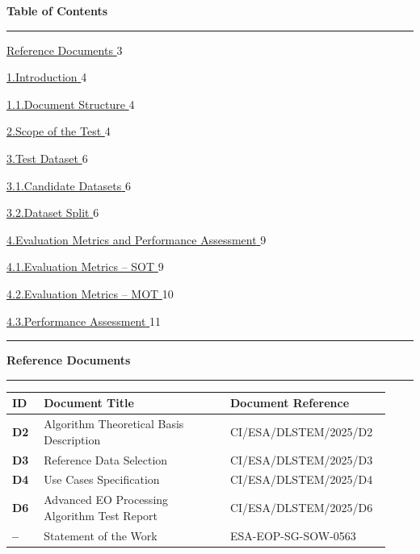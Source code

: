 \documentclass[11pt]{article}
\begin{document}
\newpage

{\centering\Large\bfseries Table of Contents\par}
\vspace{0.8cm}
\noindent\rule{\linewidth}{0.6pt}

\newcommand{\tocentry}[3]{%
  \noindent\hyperlink{#1}{%
    {\normalsize #2}%
  }\hfill{\normalsize #3}\par\vspace{0.25cm}%
}
\newcommand{\tocsub}[3]{%
  \noindent\hspace{1.2em}\hyperlink{#1}{%
    {\normalsize\color{gray} #2}%
  }\hfill{\normalsize\color{gray} #3}\par\vspace{0.2cm}%
}

\tocentry{_Toc1974584720}{Reference Documents}{3}
\tocentry{introduction}{1.\enspace Introduction}{4}
\tocsub{introduction}{1.1.\enspace Document Structure}{4}
\tocentry{Scope of the test}{2.\enspace Scope of the Test}{4}
\tocentry{Test dataset}{3.\enspace Test Dataset}{6}
\tocsub{Test dataset}{3.1.\enspace Candidate Datasets}{6}
\tocsub{Test dataset}{3.2.\enspace Dataset Split}{6}
\tocentry{Evaluation Metrics and Performance Assessment}{4.\enspace Evaluation Metrics and Performance Assessment}{9}
\tocsub{Evaluation Metrics - SOT}{4.1.\enspace Evaluation Metrics -- SOT}{9}
\tocsub{Evaluation Metrics - MOT}{4.2.\enspace Evaluation Metrics -- MOT}{10}
\tocsub{Performance assessment}{4.3.\enspace Performance Assessment}{11}

\vspace{0.1cm}
\noindent\rule{\linewidth}{0.6pt}

\newpage

\protect\hypertarget{_Toc1974584720}{}{}%
{\centering\Large\bfseries Reference Documents\par}
\vspace{0.6cm}
\noindent\rule{\linewidth}{0.6pt}

\renewcommand{\arraystretch}{1.5}
\begin{longtable}[]{@{}
  >{\centering\bfseries\arraybackslash}p{0.08\linewidth}
  >{\raggedright\arraybackslash}p{0.47\linewidth}
  >{\raggedright\arraybackslash}p{0.38\linewidth}@{}}
\rowcolor{gray!20}
\textbf{ID} & \textbf{Document Title} & \textbf{Document Reference} \\
\midrule\noalign{}
\endhead
\bottomrule\noalign{}
\endlastfoot
D2 & Algorithm Theoretical Basis Description & CI/ESA/DLSTEM/2025/D2 \\
D3 & Reference Data Selection & CI/ESA/DLSTEM/2025/D3 \\
D4 & Use Cases Specification & CI/ESA/DLSTEM/2025/D4 \\
D6 & Advanced EO Processing Algorithm Test Report & CI/ESA/DLSTEM/2025/D6 \\
-- & Statement of the Work & ESA-EOP-SG-SOW-0563 \\
\end{longtable}
\renewcommand{\arraystretch}{1}
\end{document}

